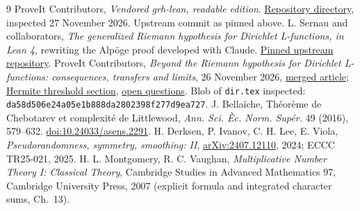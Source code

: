 \documentclass[11pt]{article}
\theoremstyle{remark}\newtheorem{remark}[theorem]{Remark}
\begin{document}
\begin{thebibliography}{9}
 ProveIt Contributors, \emph{Vendored grh-lean, readable edition}. \href{https://github.com/VladimirReshetnikov/ProveIt/tree/main/Analysis/GeneralizedRiemannHypothesis/vendor/grh-lean}{Repository directory}, inspected 27 November 2026. Upstream commit as pinned above.
 L. Sernau and collaborators, \emph{The generalized Riemann hypothesis for Dirichlet L-functions, in Lean 4}, rewriting the Alp\"oge proof developed with Claude. \href{https://github.com/lsernau/grh-lean/tree/72fead102f663d5c7a407964a13dc0cf9d977207}{Pinned upstream repository}.
 ProveIt Contributors, \emph{Beyond the Riemann hypothesis for Dirichlet L-functions: consequences, transfers and limits}, 26 November 2026, \href{https://github.com/VladimirReshetnikov/ProveIt/tree/main/Analysis/GeneralizedRiemannHypothesis/Article}{merged article}; \href{https://github.com/VladimirReshetnikov/ProveIt/blob/main/Analysis/GeneralizedRiemannHypothesis/Article/sections/dir.tex#L3538}{Hermite threshold section}, \href{https://github.com/VladimirReshetnikov/ProveIt/blob/main/Analysis/GeneralizedRiemannHypothesis/Article/sections/dir.tex#L3847}{open questions}. Blob of \texttt{dir.tex} inspected: \texttt{da58d506e24a05e1b888da2802398f277d9ea727}.
 J. Bella\"iche, Th\'eor\`eme de Chebotarev et complexit\'e de Littlewood, \emph{Ann. Sci. \`Ec. Norm. Sup\'er.} 49 (2016), 579--632. \href{https://doi.org/10.24033/asens.2291}{doi:10.24033/asens.2291}.
 H. Derksen, P. Ivanov, C. H. Lee, E. Viola, \emph{Pseudorandomness, symmetry, smoothing: II}, \href{https://arxiv.org/abs/2407.12110}{arXiv:2407.12110}, 2024; ECCC TR25-021, 2025.
 H. L. Montgomery, R. C. Vaughan, \emph{Multiplicative Number Theory I: Classical Theory}, Cambridge Studies in Advanced Mathematics 97, Cambridge University Press, 2007 (explicit formula and integrated character sums, Ch.~13).
\end{thebibliography}
\end{document}
